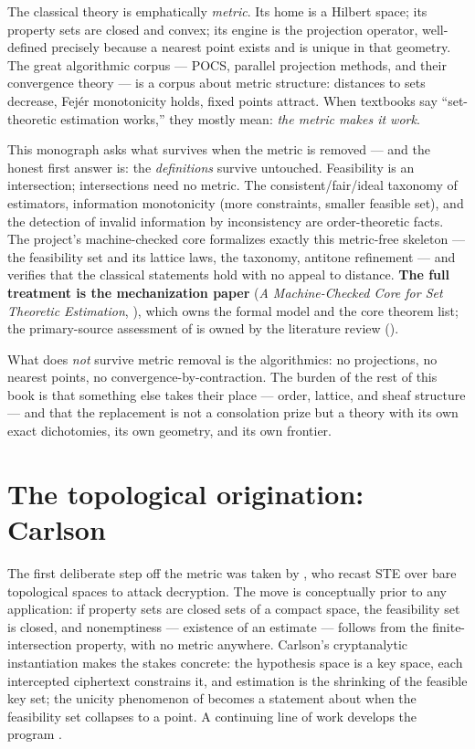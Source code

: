 \documentclass[10pt,twocolumn]{report}
\newcommand{\code}[1]{\texttt{\seqsplit{#1}}}
\renewcommand{\[}{\par\smallskip\noindent\begin{adjustbox}{max width=\columnwidth}$\displaystyle}%
\renewcommand{\]}{$\end{adjustbox}\par\smallskip}%
\theoremstyle{definition}
\theoremstyle{remark}
\begin{document}
The classical theory is emphatically \emph{metric}.  Its home is a
Hilbert space; its property sets are closed and convex; its engine is
the projection operator, well-defined precisely because a nearest point
exists and is unique in that geometry.  The great algorithmic corpus
--- POCS, parallel projection methods, and their convergence theory
\citep{bauschke1996,combettes2011proximal} --- is a corpus about
metric structure: distances to sets decrease, Fej\'er monotonicity
holds, fixed points attract.  When textbooks say ``set-theoretic
estimation works,'' they mostly mean: \emph{the metric makes it work}.

This monograph asks what survives when the metric is removed --- and
the honest first answer is: the \emph{definitions} survive untouched.
Feasibility is an intersection; intersections need no metric.  The
consistent/fair/ideal taxonomy of estimators, information monotonicity
(more constraints, smaller feasible set), and the detection of invalid
information by inconsistency are order-theoretic facts.  The project's
machine-checked core formalizes exactly this metric-free skeleton ---
the feasibility set and its lattice laws, the taxonomy, antitone
refinement --- and verifies that the classical statements hold with no
appeal to distance.  \textbf{The full treatment is the mechanization
paper} (\emph{A Machine-Checked Core for Set Theoretic Estimation},
\code{ste-mechanization.tex}), which owns the formal model and the
core theorem list; the primary-source assessment of
\citet{combettes1993} is owned by the literature review
(\code{literature-review.tex}).

What does \emph{not} survive metric removal is the algorithmics: no
projections, no nearest points, no convergence-by-contraction.  The
burden of the rest of this book is that something else takes their
place --- order, lattice, and sheaf structure --- and that the
replacement is not a consolation prize but a theory with its own exact
dichotomies, its own geometry, and its own frontier.

\chapter{The topological origination: Carlson}
\label{ch:carlson}

The first deliberate step off the metric was taken by
\citet{carlson2012}, who recast STE over bare topological spaces to
attack decryption.  The move is conceptually prior to any application:
if property sets are closed sets of a compact space, the feasibility
set is closed, and nonemptiness --- existence of an estimate --- follows
from the finite-intersection property, with no metric anywhere.
Carlson's cryptanalytic instantiation makes the stakes concrete: the
hypothesis space is a key space, each intercepted ciphertext constrains
it, and estimation is the shrinking of the feasible key set; the
unicity phenomenon of \citet{shannon1949} becomes a statement about
when the feasibility set collapses to a point.  A continuing line of
work develops the program
\citep{carlson2005,carlson2014breaking,carlson2021keyspace,
carlson2022equivalence,carlson2022localentropy,carlson2026entropy}.
\end{document}
